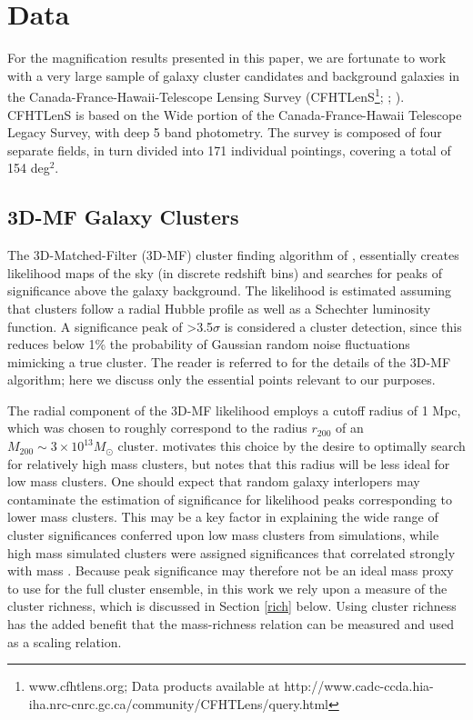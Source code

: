
\section{Data}
\label{data}
For the magnification results presented in this paper, we are fortunate to work with a very large sample of galaxy cluster candidates and background galaxies in the Canada-France-Hawaii-Telescope Lensing Survey (CFHTLenS\footnote[1]{www.cfhtlens.org; Data products available at http://www.cadc-ccda.hia-iha.nrc-cnrc.gc.ca/\-community/\-CFHTLens/\-query.html}; \citet{Erben13}; \citet{Hildebrandt12}). CFHTLenS is based on the Wide portion of the Canada-France-Hawaii Telescope Legacy Survey, with deep 5 band photometry. The survey is composed of four separate fields, in turn divided into 171 individual pointings, covering a total of 154 deg$^2$.

\subsection{3D-MF Galaxy Clusters}
\label{clusters}
The 3D-Matched-Filter (3D-MF) cluster finding algorithm of \citet{Milkeraitis10}, essentially creates likelihood maps of the sky (in discrete redshift bins) and searches for peaks of significance above the galaxy background. The likelihood is estimated assuming that clusters follow a radial Hubble profile as well as a Schechter luminosity function. A significance peak of \textgreater 3.5$\sigma$ is considered a cluster detection, since this reduces below 1\% the probability of Gaussian random noise fluctuations mimicking a true cluster. The reader is referred to \citet{Milkeraitis10} for the details of the 3D-MF algorithm; here we discuss only the essential points relevant to our purposes. 

The radial component of the 3D-MF likelihood employs a cutoff radius of 1 Mpc, which was chosen to roughly correspond to the radius $r_{200}$ of an $M_{200} \sim 3 \times 10^{13} M_{\odot}$ cluster. \citet{Milkeraitis10} motivates this choice by the desire to optimally search for relatively high mass clusters, but notes that this radius will be less ideal for low mass clusters. One should expect that random galaxy interlopers may contaminate the estimation of significance for likelihood peaks corresponding to lower mass clusters. This may be a key factor in explaining the wide range of cluster significances conferred upon low mass clusters from simulations, while high mass simulated clusters were assigned significances that correlated strongly with mass \citep[see Figure 10 in][]{Milkeraitis10}. Because peak significance may therefore not be an ideal mass proxy to use for the full cluster ensemble, in this work we rely upon a measure of the cluster richness, which is discussed in Section \ref{rich} below. Using cluster richness has the added benefit that the mass-richness relation can be measured and used as a scaling relation.

